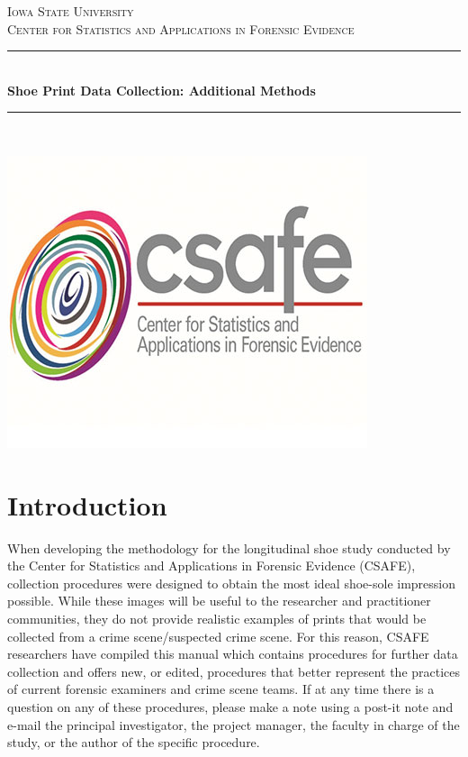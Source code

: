 \documentclass[12pt]{article}
\begin{document}
\begin{titlepage}

\newcommand{\HRule}{\rule{\linewidth}{0.5mm}}
\center 

\textsc{\LARGE Iowa State University }\\[1.5cm] 
\textsc{\Large Center for Statistics and Applications in Forensic
Evidence
}\\[0.5cm] 

\HRule \\[0.4cm]
{ \huge \bfseries Shoe Print Data Collection: Additional Methods }\\[0.4cm] 
\HRule \\[1.5cm]



\begin{center}
\centering
 \includegraphics[scale=.4]{csafe-logo}\\[1cm]
\end{center}







\end{titlepage}

\section{Introduction}

 When developing the methodology for the longitudinal shoe study conducted by the Center for Statistics and Applications in Forensic Evidence (CSAFE), collection procedures were designed to obtain the most ideal shoe-sole impression possible. While these images will be useful to the researcher and practitioner communities, they do not provide realistic examples of prints that would be collected from a crime scene/suspected crime scene. For this reason, CSAFE researchers have compiled this manual which contains procedures for further data collection and offers new, or edited, procedures that better represent the practices of current forensic examiners and crime scene teams. If at any time there is a question on any of these procedures, please make a note using a post-it note and e-mail the principal investigator, the project manager, the faculty in charge of the study, or the author of the specific procedure. 
\end{document}
